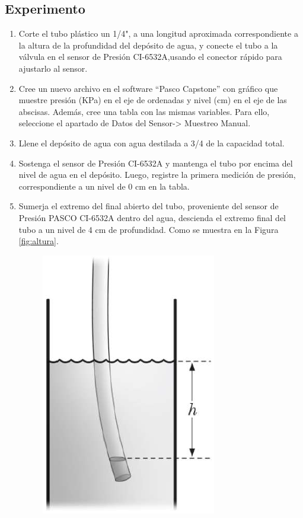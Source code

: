 \documentclass[12pt,letterpaper]{report}
\begin{document}
\subsection{Experimento}
\begin{enumerate}
    
    \item Corte el tubo plástico un 1/4", a una longitud aproximada correspondiente a la altura de la profundidad del depósito de agua, y conecte el tubo a la válvula en el sensor de Presión CI-6532A,usando el conector rápido para ajustarlo al sensor.
    \item Cree un nuevo archivo en el software “Pasco Capstone” con gráfico que muestre presión (KPa) en el eje de ordenadas y nivel (cm) en el eje de las abscisas. Además, cree una tabla con las mismas variables. Para ello, seleccione el apartado de Datos del Sensor-> Muestreo Manual.
    \item Llene el depósito de agua con agua destilada a 3/4 de la capacidad total.
    \item Sostenga el sensor de Presión CI-6532A y mantenga el tubo por encima del nivel de agua en el depósito. Luego, registre la primera medición de presión, correspondiente a un nivel de 0 cm en la tabla. 
    \item Sumerja el extremo del final abierto del tubo, proveniente del sensor de Presión PASCO CI-6532A dentro del agua, descienda el extremo final del tubo a un nivel de 4 cm de profundidad. Como se muestra en la Figura \ref{fig:altura}.
    \begin{figure} [!ht]
        \centering
        \includegraphics{fig/Nivel/Altura.PNG}

\end{figure}
\end{enumerate}
\end{document}
